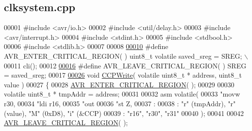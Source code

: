 \hypertarget{clksystem_8cpp_source}{
\subsection{clksystem.cpp}
}

\begin{DoxyCode}
00001 \textcolor{preprocessor}{#include <avr/io.h>}
00002 \textcolor{preprocessor}{#include <util/delay.h>}
00003 \textcolor{preprocessor}{#include <avr/interrupt.h>}
00004 \textcolor{preprocessor}{#include <stdint.h>}
00005 \textcolor{preprocessor}{#include <stdbool.h>}
00006 \textcolor{preprocessor}{#include <stdlib.h>}
00007 
00008 
\hypertarget{clksystem_8cpp_source_l00010}{}\hyperlink{clksystem_8cpp_a0a4fb62f9e69209c9c8c8e34ebb3df6f}{00010} \textcolor{preprocessor}{#define AVR\_ENTER\_CRITICAL\_REGION( ) uint8\_t volatile saved\_sreg = SREG; \(\backslash\)}
00011 \textcolor{preprocessor}{                                     cli();}
00012 \textcolor{preprocessor}{}
\hypertarget{clksystem_8cpp_source_l00016}{}\hyperlink{clksystem_8cpp_a770b47b04eec57748be0826a3d23503b}{00016} \textcolor{preprocessor}{#define AVR\_LEAVE\_CRITICAL\_REGION( ) SREG = saved\_sreg;}
00017 \textcolor{preprocessor}{}
\hypertarget{clksystem_8cpp_source_l00026}{}\hyperlink{clksystem_8cpp_aad4e162434c2cc7e0087bbc0ddfe266c}{00026} \textcolor{keywordtype}{void} \hyperlink{clksystem_8cpp_aad4e162434c2cc7e0087bbc0ddfe266c}{CCPWrite}( \textcolor{keyword}{volatile} uint8\_t * address, uint8\_t value )
00027 \{
00028     \hyperlink{clksystem_8cpp_a0a4fb62f9e69209c9c8c8e34ebb3df6f}{AVR_ENTER_CRITICAL_REGION}( );
00029 
00030     \textcolor{keyword}{volatile} uint8\_t * tmpAddr = address;
00031 
00032     \textcolor{keyword}{asm} \textcolor{keyword}{volatile}(
00033         \textcolor{stringliteral}{"movw r30,  %
00034         \textcolor{stringliteral}{"ldi  r16,  %
00035         \textcolor{stringliteral}{"out   %
00036         \textcolor{stringliteral}{"st     Z,  %
00037         :
00038         : \textcolor{stringliteral}{"r"} (tmpAddr), \textcolor{stringliteral}{"r"} (value), \textcolor{stringliteral}{"M"} (0xD8), \textcolor{stringliteral}{"i"} (&CCP)
00039         : \textcolor{stringliteral}{"r16"}, \textcolor{stringliteral}{"r30"}, \textcolor{stringliteral}{"r31"}
00040     );
00041 
00042     \hyperlink{clksystem_8cpp_a770b47b04eec57748be0826a3d23503b}{AVR_LEAVE_CRITICAL_REGION}( );
}}}}
\end{DoxyCode}
